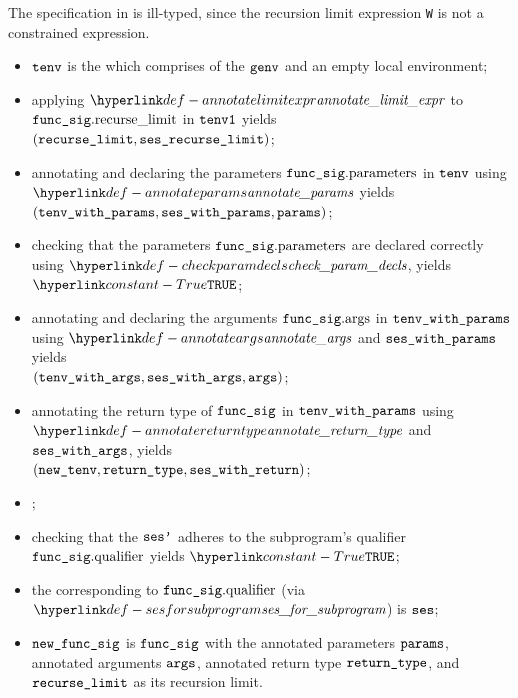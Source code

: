 The specification in  is ill-typed, since the recursion limit expression \verb|W|
is not a constrained expression.

\ProseParagraph
\AllApply
\begin{itemize}
  \item $\texttt{tenv}$ is the \staticenvironmentterm{} which comprises of the \globalstaticenvironmentterm{} $\texttt{genv}$ and an empty local environment;
  \item applying $\annotatelimitexpr$ to $\texttt{func\_sig}.\text{recurse\_limit}$ in $\texttt{tenv1}$ yields \\
        $(\texttt{recurse\_limit}, \texttt{ses\_recurse\_limit})$\ProseOrTypeError;
  \item annotating and declaring the parameters $\texttt{func\_sig}.\text{parameters}$ in $\texttt{tenv}$ using \\
        $\annotateparams$ yields $(\texttt{tenv\_with\_params}, \texttt{ses\_with\_params}, \texttt{params})$\ProseOrTypeError;
  \item checking that the parameters $\texttt{func\_sig}.\text{parameters}$ are declared correctly using $\checkparamdecls$, yields $\True$\ProseOrTypeError;
  \item annotating and declaring the arguments $\texttt{func\_sig}.\text{args}$ in $\texttt{tenv\_with\_params}$ using $\annotateargs$
        and $\texttt{ses\_with\_params}$ yields\\
        $(\texttt{tenv\_with\_args}, \texttt{ses\_with\_args}, \texttt{args})$\ProseOrTypeError;
  \item annotating the return type of $\texttt{func\_sig}$ in $\texttt{tenv\_with\_params}$ using \\ $\annotatereturntype$ and $\texttt{ses\_with\_args}$, yields\\
        $(\texttt{new\_tenv}, \texttt{return\_type}, \texttt{ses\_with\_return})$\ProseOrTypeError;
  \item {};
  \item checking that the \sideeffectsetterm{} $\texttt{ses'}$ adheres to the subprogram's \purity{} qualifier $\texttt{func\_sig}.\text{qualifier}$ yields $\True$\ProseOrTypeError;
  \item the \sideeffectsetterm{} corresponding to $\texttt{func\_sig}.\text{qualifier}$ (via $\sesforsubprogram$) is $\texttt{ses}$;
  \item $\texttt{new\_func\_sig}$ is $\texttt{func\_sig}$ with the annotated parameters $\texttt{params}$, annotated arguments $\texttt{args}$, annotated return type $\texttt{return\_type}$,
        and $\texttt{recurse\_limit}$ as its recursion limit.
\end{itemize}


